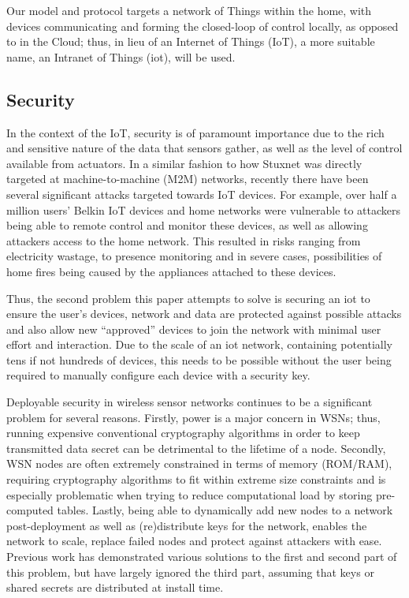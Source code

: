 \documentclass[conference]{./sty/IEEEtran}
\begin{document}
Our model and protocol targets a network of Things within the home, with devices communicating and forming the closed-loop of control locally, as opposed to in the Cloud; thus, in lieu of an Internet of Things (IoT), a more suitable name, an Intranet of Things (iot), will be used.

\subsection{Security} %
\label{sub:motivation_security}
In the context of the IoT, security is of paramount importance due to the rich and sensitive nature of the data that sensors gather, as well as the level of control available from actuators. In a similar fashion to how Stuxnet was directly targeted at machine-to-machine (M2M) networks\cite{Stuxnet}, recently there have been several significant attacks targeted towards IoT devices\cite{IoTWorm,BelkinWemo}. For example, over half a million users' Belkin IoT devices and home networks were vulnerable to attackers being able to remote control and monitor these devices, as well as allowing attackers access to the home network\cite{BelkinWemo}. This resulted in risks ranging from electricity wastage, to presence monitoring and in severe cases, possibilities of home fires being caused by the appliances attached to these devices.

Thus, the second problem this paper attempts to solve is securing an iot to ensure the user's devices, network and data are protected against possible attacks and also allow new ``approved'' devices to join the network with minimal user effort and interaction. Due to the scale of an iot network, containing potentially tens if not hundreds of devices, this needs to be possible without the user being required to manually configure each device with a security key.

Deployable security in wireless sensor networks continues to be a significant problem for several reasons. Firstly, power is a major concern in WSNs; thus, running expensive conventional cryptography algorithms in order to keep transmitted data secret can be detrimental to the lifetime of a node. Secondly, WSN nodes are often extremely constrained in terms of memory (ROM/RAM), requiring cryptography algorithms to fit within extreme size constraints and is especially problematic when trying to reduce computational load by storing pre-computed tables. Lastly, being able to dynamically add new nodes to a network post-deployment as well as (re)distribute keys for the network, enables the network to scale, replace failed nodes and protect against attackers with ease. Previous work has demonstrated various solutions to the first and second part of this problem\cite{TinySec,MiniSec,TinyECC}, but have largely ignored the third part, assuming that keys or shared secrets are distributed at install time.
\end{document}
